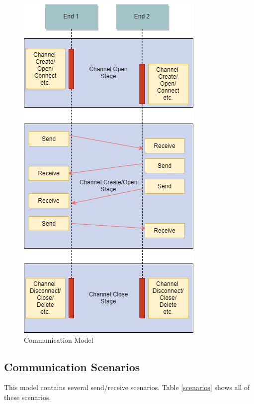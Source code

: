\begin{figure}[h]
\centerline{\includegraphics[scale=0.6]{Figures/communicationhappen}}
 \caption{Communication Model}
\label{communicationhappen}
\end{figure}


\subsection{Communication Scenarios}
This model contains several send/receive scenarios. Table \ref{scenarios} shows all of these scenarios.


